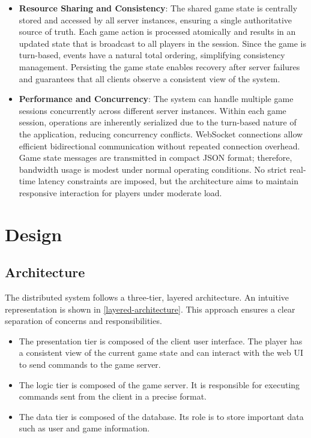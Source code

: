\documentclass{scrartcl}
\begin{document}
\begin{itemize}
  \item \textbf{Resource Sharing and Consistency}: \newline
  The shared game state is centrally stored and accessed by all server instances, ensuring a single authoritative source of truth. 
  Each game action is processed atomically and results in an updated state that is broadcast to all players in the session. 
  Since the game is turn-based, events have a natural total ordering, simplifying consistency management. 
  Persisting the game state enables recovery after server failures and guarantees that all clients observe a consistent view of the system.

  \item \textbf{Performance and Concurrency}: \newline
  The system can handle multiple game sessions concurrently across different server instances. 
  Within each game session, operations are inherently serialized due to the turn-based nature of the application, reducing concurrency conflicts. 
  WebSocket connections allow efficient bidirectional communication without repeated connection overhead. 
  Game state messages are transmitted in compact JSON format; therefore, bandwidth usage is modest under normal operating conditions. 
  No strict real-time latency constraints are imposed, but the architecture aims to maintain responsive interaction for players under moderate load.

\end{itemize}
\newpage
\section{Design}\label{design}

\subsection{Architecture}\label{architecture}

The distributed system follows a three-tier, layered architecture. An intuitive representation is shown in \autoref{layered-architecture}.
This approach ensures a clear separation of concerns and responsibilities.
  \begin{itemize}
    \item The presentation tier is composed of the client user interface. The player has a consistent view of the current game state and can interact with the web UI to send commands to the game server. 
    \item The logic tier is composed of the game server. It is responsible for executing commands sent from the client in a precise format.
    \item The data tier is composed of the database. Its role is to store important data such as user and game information.
  \end{itemize}
  
\end{document}
